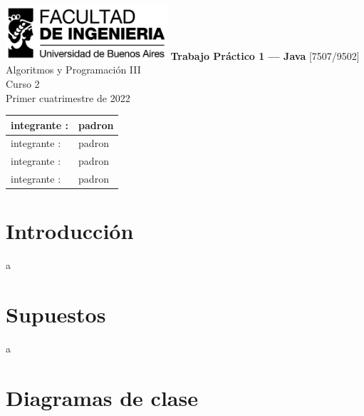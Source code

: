 \documentclass[titlepage,a4paper]{article}
\begin{document}
\begin{titlepage} %
	\hfill\includegraphics[width=6cm]{logofiuba.jpg}
    \centering
    \vfill
    \Huge \textbf{Trabajo Práctico 1 — Java}
    \vskip2cm
    \Large [7507/9502] Algoritmos y Programación III\\
    Curso 2 \\ %
    Primer cuatrimestre de 2022 
    \vfill
    \begin{tabular}{ | l | l | } %
      \hline
      integrante : & padron \\ \hline
      integrante : & padron \\ \hline
      integrante : & padron \\\hline
      integrante : & padron\\ \hline
      \hline
  	\end{tabular}
    \vfill
    \vfill
\end{titlepage}

\tableofcontents %
\newpage

\section{Introducción}\label{sec:intro}
a

\section{Supuestos}\label{sec:supuestos}

a

\section{Diagramas de clase}\label{sec:diagramasdeclase}
\end{document}

